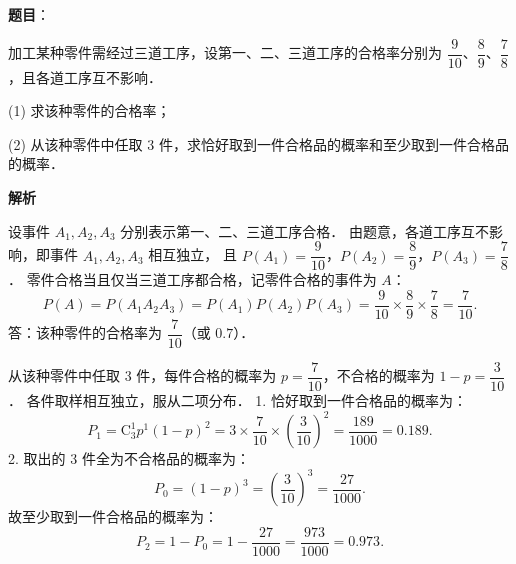 \begin{answer}

\textbf{题目}：

加工某种零件需经过三道工序，设第一、二、三道工序的合格率分别为 $\dfrac{9}{10}$、$\dfrac{8}{9}$、$\dfrac{7}{8}$，且各道工序互不影响．

(1) 求该种零件的合格率；

(2) 从该种零件中任取 3 件，求恰好取到一件合格品的概率和至少取到一件合格品的概率．

\textbf{解析}


设事件 $A_1, A_2, A_3$ 分别表示第一、二、三道工序合格．
由题意，各道工序互不影响，即事件 $A_1, A_2, A_3$ 相互独立，
且 $P(A_1) = \dfrac{9}{10}$，$P(A_2) = \dfrac{8}{9}$，$P(A_3) = \dfrac{7}{8}$．
零件合格当且仅当三道工序都合格，记零件合格的事件为 $A$：
\nopagebreak[4]
\[
P(A) = P(A_1 A_2 A_3) = P(A_1) P(A_2) P(A_3) = \frac{9}{10} \times \frac{8}{9} \times \frac{7}{8} = \frac{7}{10}.
\]
答：该种零件的合格率为 $\dfrac{7}{10}$（或 $0.7$）．


从该种零件中任取 3 件，每件合格的概率为 $p = \dfrac{7}{10}$，不合格的概率为 $1 - p = \dfrac{3}{10}$．
各件取样相互独立，服从二项分布．
1. 恰好取到一件合格品的概率为：
\nopagebreak[4]
\[
P_1 = \mathrm{C}_3^1 p^1 (1 - p)^2 = 3 \times \frac{7}{10} \times \left(\frac{3}{10}\right)^2 = \frac{189}{1000} = 0.189.
\]
2. 取出的 3 件全为不合格品的概率为：
\nopagebreak[4]
\[
P_0 = (1 - p)^3 = \left(\frac{3}{10}\right)^3 = \frac{27}{1000}.
\]
故至少取到一件合格品的概率为：
\nopagebreak[4]
\[
P_2 = 1 - P_0 = 1 - \frac{27}{1000} = \frac{973}{1000} = 0.973.
\]



\end{answer}
